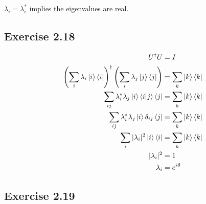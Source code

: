 \documentclass{article}
\begin{document}
$\lambda_i = \lambda_i^*$ implies the eigenvalues are real.

\subsection*{Exercise 2.18}

\begin{align*}
  U^\dag U                                                                                             & = I                      \\
  \left( \sum_i \lambda_i \ket{i} \bra{i} \right)^\dag \left( \sum_i \lambda_j \ket{j} \bra{j} \right) & = \sum_k \ket{k} \bra{k} \\
  \sum_{i j} \lambda_i^* \lambda_j \ket{i} \braket{i | j} \bra{j}                                      & = \sum_k \ket{k} \bra{k} \\
  \sum_{i j} \lambda_i^* \lambda_j \ket{i} \delta_{i j} \bra{j}                                        & = \sum_k \ket{k} \bra{k} \\
  \sum_i |\lambda_i|^2 \ket{i} \bra{i}                                                                 & = \sum_k \ket{k} \bra{k} \\
  |\lambda_i|^2                                                                                        & = 1                      \\
  \lambda_i                                                                                            & = e^{i \theta}
\end{align*}

\subsection*{Exercise 2.19}
\end{document}
